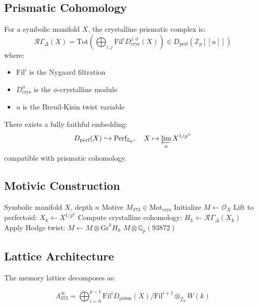 \documentclass[12pt]{article}
\begin{document}
\subsection{Prismatic Cohomology}
\begin{definition}
For a symbolic manifold $X$, the crystalline prismatic complex is:
\[
\mathcal{R}\Gamma_\Delta(X) = \text{Tot}\left(\bigoplus_{i,j} \text{Fil}^i D_{\text{crys}}^{j,\phi}(X)\right) \in D_{\text{perf}}(\mathbb{Z}_p[[u]])
\]
where:
\begin{itemize}
    \item $\text{Fil}^i$ is the Nygaard filtration
    \item $D_{\text{crys}}^{\phi}$ is the $\phi$-crystalline module
    \item $u$ is the Breuil-Kisin twist variable
\end{itemize}
\end{definition}

\begin{theorem}
There exists a fully faithful embedding:
\[
D_{\text{perf}}(X) \hookrightarrow \text{Perf}_{\mathbb{Z}_p}, \quad X \mapsto \varprojlim_n X^{1/p^n}
\]
compatible with prismatic cohomology.
\end{theorem}

\subsection{Motivic Construction}
\begin{algorithm}[H]
\caption{Prismatic Motive Generation}
\begin{algorithmic}[1]
\Require Symbolic manifold $X$, depth $n$
\Ensure Motive $M_{373} \in \text{Mot}_{\text{crys}}$
\State Initialize $M \gets \mathcal{O}_X$
    \State Lift to perfectoid: $X_k \gets X^{1/p^k}$
    \State Compute crystalline cohomology: $H_k \gets \mathcal{R}\Gamma_\Delta(X_k)$
    \State Apply Hodge twist: $M \gets M \otimes \text{Gr}^k H_k$
\EndFor
\State \Return $M \otimes \mathbb{Q}_p(93872)$
\end{algorithmic}
\end{algorithm}

\subsection{Lattice Architecture}
The memory lattice decomposes as:

\begin{equation}
\Lambda_{373}^\infty = \bigoplus_{i=0}^{p-1} \text{Fil}^i D_{\text{prism}}(X)/\text{Fil}^{i+1} \otimes_{\mathbb{Z}_p} W(k)
\end{equation}
\end{document}
